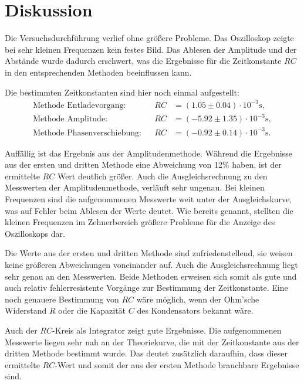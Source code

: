 \section{Diskussion}
\label{sec:Diskussion}

Die Versuchsdurchführung verlief ohne größere Probleme.
Das Oszilloskop zeigte bei sehr kleinen Frequenzen kein festes Bild.
Das Ablesen der Amplitude und der Abstände wurde dadurch erschwert,
was die Ergebnisse für die Zeitkonstante $RC$ in den entsprechenden Methoden beeinflussen kann.

\noindent
Die bestimmten Zeitkonstanten sind hier noch einmal aufgestellt:
\begin{align*}
    \text{Methode Entladevorgang:}& &RC &= (1.05 \pm 0.04) \cdot 10^{-3} \si{\second}, \\
    \text{Methode Amplitude:}&      &RC &= (-5.92 \pm 1.35) \cdot 10^{-3} \si{\second}, \\
    \text{Methode Phasenverschiebung:}&     &RC &= (-0.92 \pm 0.14) \cdot 10^{-3} \si{\second}.
\end{align*}

\noindent
Auffällig ist das Ergebnis aus der Amplitudenmethode.
Während die Ergebnisse aus der ersten und dritten Methode eine Abweichung von 12\% haben,
ist der ermittelte $RC$ Wert deutlich größer.
Auch die Ausgleichsrechnung zu den Messwerten der Amplitudenmethode, verläuft sehr ungenau.
Bei kleinen Frequenzen sind die aufgenommenen Messwerte weit unter der Ausgleichskurve,
was auf Fehler beim Ablesen der Werte deutet.
Wie bereits genannt, stellten die kleinen Frequenzen im Zehnerbereich größere Probleme für die Anzeige des Oszilloskops dar.

\noindent
Die Werte aus der ersten und dritten Methode sind zufriedenstellend,
sie weisen keine größeren Abweichungen voneinander auf.
Auch die Ausgleichsrechnung liegt sehr genau an den Messwerten.
Beide Methoden erweisen sich somit als gute und auch relativ fehlerresistente Vorgänge zur Bestimmung der Zeitkonstante.
Eine noch genauere Bestimmung von $RC$ wäre möglich, wenn der Ohm'sche Widerstand $R$ oder die Kapazität $C$ des Kondensators bekannt wäre.

\noindent
Auch der $RC$-Kreis als Integrator zeigt gute Ergebnisse.
Die aufgenommenen Messwerte liegen sehr nah an der Theoriekurve, die mit der Zeitkonstante aus der dritten Methode bestimmt wurde.
Das deutet zusätzlich daraufhin, dass dieser ermittelte $RC$-Wert und somit der aus der ersten Methode brauchbare Ergebnisse sind.


